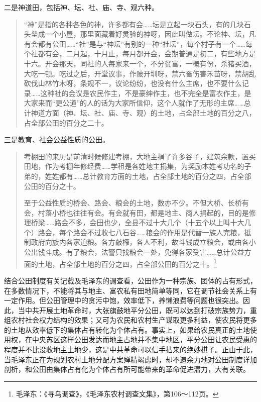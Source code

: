 二是神道田，包括神、坛、社、庙、寺、观六种。

\begin{quote}

“神”是指的各种各色的神，许多都有会……坛是立起一块石头，有的几块石头垒成一个小屋，那里面藏着好灵验的神呀，因此叫做坛。不论神、坛，凡有会都有公田……“社”是与“神坛”有别的一种“社坛”，每个村子有一个……每个社都有会，二月起，十月止，每月都开会，会期普通是初二，有些地方是十六。开会那天，同社的人每家来一个，不分贫富，一概有份，杀猪买酒，大吃一顿。吃过之后，开堂议事，作陂开圳呀，禁六畜伤害禾苗呀，禁胡乱砍伐山林竹木呀，条规不一，议论纷纷，也没有什么主席，也不要什么记录……这种社的会议是农民作主，不是豪绅作主，也不完全是富农作主，是大家来而“更公道”的人的话为大家所信仰，这个人就作了无形的主席……总计神道方面（神、坛、社、庙、寺、观）的土地，占全部土地的百分之八，占全部公田的百分之二十。
\end{quote}


三是教育、社会公益性质的公田。

\begin{quote}

考棚田的来历是前清时候修建考棚，大地主捐了许多谷子，建筑余款，置买田地，作为考棚年修经费……学租是各姓地主捐集，为奖励本姓考功名的子弟的，姓姓都有……总计教育方面的土地，占全部土地的百分之四，占全部公田的百分之十。

至于公益性质的桥会、路会、粮会的土地，数亦不少。不但大桥、长桥有会，村落小桥也往往有会。有会就有田，都是地主、商人捐起的，目的是修理桥梁……路会不多，会田也少，全县不过十大几个（十五个以上叫十大几个）路会，每个路会不过收七八石谷……粮会的作用是代替一族人完粮，抵制政府向族内各家迫粮。各方敲榨，各人不利，故斗钱成立粮会，或由各小公出钱斗成。有了粮会，法警只找粮会一处，免得各家受害……总计公益方面的土地，占全部土地的百分之四，占全部公田的百分之十。\footnote{毛泽东：《寻乌调查》，《毛泽东农村调查文集》，第106～112页。}
\end{quote}


结合公田制度有关记载及毛泽东的调查看，公田作为一种宗族、团体的占有形式，在多数情况下，不能将其与地主、富农私有田地简单等同，它在调节社会关系上有一定作用。但公田管理中的贪污中饱，效率低下，养懒浪费等问题也很突出。因此，当中共开展土地革命时，大张旗鼓地平分公田，既可以达到打破宗族势力，重组农村社会权力结构的效果；又可为农民和农村生产谋取更多利益，使农民将更多的土地从效率低下的集体占有转化为个体占有。事实上，如果给农民真正的土地使用权，在中央苏区这样公田发达而地主占地并不集中地区，平分公田让农民受惠的程度并不比没收地主土地少，这是中共革命可以信手拈来的绝妙棋子。正由于此，当毛泽东正在为规划农村土地分配方案殚精竭虑时，却不遗余力地对公田制度详加剖析，和公田由集体占有化为个体占有所可能带来的革命促进潜力，大有关联。

